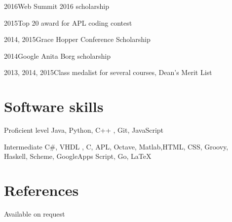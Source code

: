 \documentclass[fontsize=9pt]{tccv}
\begin{document}
\begin{factlist}
\item{2016}{Web Summit 2016 scholarship}
\item{2015}{Top 20 award for APL coding contest}
\item{2014, 2015}{Grace Hopper Conference Scholarship }
\item{2014}{Google Anita Borg scholarship}
\item{2013, 2014, 2015}{Class medalist for several courses, Dean's Merit List}
\end{factlist}

\section{Software skills}

\begin{factlist}

\item{Proficient level}
     {Java, Python, C++ , Git, JavaScript}

\item{Intermediate}
     { C\#, VHDL , C, APL, Octave, Matlab,HTML, CSS, Groovy,
     Haskell, Scheme, GoogleApps Script,  Go, \LaTeX}

\end{factlist}


\section{References}
Available on request
\end{document}

